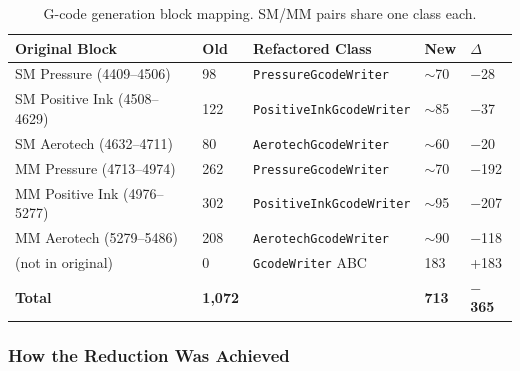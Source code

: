 \documentclass[11pt,letterpaper]{article}
\newcommand{\code}[1]{\texttt{#1}}
\begin{document}
\begin{table}[h]
\centering
\footnotesize
\begin{tabularx}{\textwidth}{X R{0.7cm} L{3.8cm} R{0.7cm} R{0.8cm}}
\toprule
\textbf{Original Block} & \textbf{Old} & \textbf{Refactored Class} & \textbf{New} & \textbf{$\Delta$} \\
\midrule
SM Pressure (4409--4506)      & 98  & \code{PressureGcodeWriter}    & $\sim$70  & $-$28 \\
SM Positive Ink (4508--4629)  & 122 & \code{PositiveInkGcodeWriter} & $\sim$85  & $-$37 \\
SM Aerotech (4632--4711)      & 80  & \code{AerotechGcodeWriter}    & $\sim$60  & $-$20 \\
MM Pressure (4713--4974)      & 262 & \code{PressureGcodeWriter}    & $\sim$70  & $-$192 \\
MM Positive Ink (4976--5277)  & 302 & \code{PositiveInkGcodeWriter} & $\sim$95  & $-$207 \\
MM Aerotech (5279--5486)      & 208 & \code{AerotechGcodeWriter}    & $\sim$90  & $-$118 \\
(not in original)             & 0   & \code{GcodeWriter} ABC        & 183       & +183 \\
\midrule
\textbf{Total}                & \textbf{1,072} & & \textbf{713} & \textbf{$-$365} \\
\bottomrule
\end{tabularx}
\caption{G-code generation block mapping. SM/MM pairs share one class each.}
\end{table}

\subsubsection{How the Reduction Was Achieved}
\end{document}
